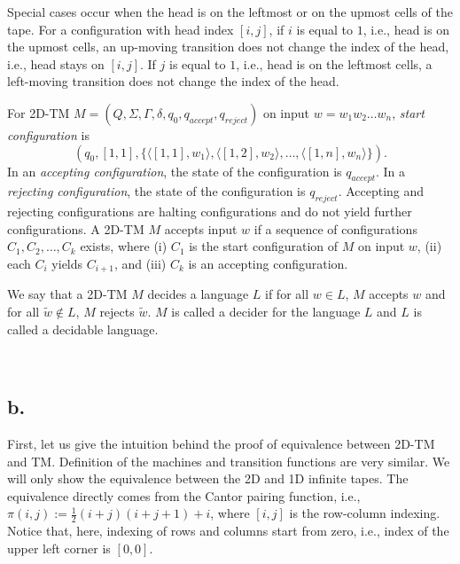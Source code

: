 \documentclass[12pt]{article}
\begin{document}
Special cases occur when the head is on the leftmost or on the upmost cells of the tape. For a configuration with head index $[i, j]$, if $i$ is equal to $1$, i.e., head is on the upmost cells, an up-moving transition does not change the index of the head, i.e., head stays on $[i, j]$. If $j$ is equal to $1$, i.e., head is on the leftmost cells, a left-moving transition does not change the index of the head.

For 2D-TM $M = (Q, \Sigma, \Gamma, \delta, q_0, q_{accept}, q_{reject})$ on input $w = w_1w_2\ldots w_n$, \emph{start configuration} is
\[\left(q_0, [1, 1], \{ \langle [1,1], w_1 \rangle, \langle [1,2], w_2 \rangle, \ldots, \langle [1,n], w_n \rangle \} \right).\]
In an \emph{accepting configuration}, the state of the configuration is $q_{accept}$. In a \emph{rejecting configuration}, the state of the configuration is $q_{reject}$. Accepting and rejecting configurations are halting configurations and do not yield further configurations. A 2D-TM $M$ accepts input $w$ if a sequence of configurations $C_1, C_2, \ldots, C_k$ exists, where (i) $C_1$ is the start configuration of $M$ on input $w$, (ii) each $C_i$ yields $C_{i+1}$, and (iii) $C_k$ is an accepting configuration.

We say that a 2D-TM $M$ decides a language $L$ if for all $w \in L$, $M$ accepts $w$ and for all $\tilde{w} \not \in L$, $M$ rejects $\tilde{w}$. $M$ is called a decider for the language $L$ and $L$ is called a decidable language.


\
\subsection*{b.}

First, let us give the intuition behind the proof of equivalence between 2D-TM and TM. Definition of the machines and transition functions are very similar. We will only show the equivalence between the 2D and 1D infinite tapes. The equivalence directly comes from the Cantor pairing function, i.e., $\pi(i, j) := \frac{1}{2}(i + j)(i + j + 1) + i$, where $[i, j]$ is the row-column indexing. Notice that, here, indexing of rows and columns start from zero, i.e., index of the upper left corner is $[0, 0]$.
\end{document}
